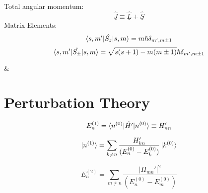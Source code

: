 \documentclass[table,cmyk]{article}
\begin{document}
\begin{longtable}
{\begin{minipage}{7.4cm}
\end{minipage}
}
\vspace{0.3cm}

Total angular momentum:
\[ \hat{\underline{J}} \equiv \hat{\underline{L}}+\hat{\underline{S}}\]
Matrix Elements:
\[\braket{s,m'|\hat{S_z}|s,m} = m\hbar \delta_{m',m\pm1}\]
\[\braket{s,m'|\hat{S_{\pm}}|s,m} = \sqrt{s(s+1)-m(m\pm1)} \hbar \delta_{m',m\pm1}\]

&
\section*{Perturbation Theory}
\[E_n^{(1)} = \braket{n^{(0)}|\hat{H'}|n^{(0)}} \equiv H_{nn}'\]

\[ \ket{n^{(1)}} = \sum_{k\ne n} \frac{H_{kn}'}{(E_n^{(0)}-E_k^{(0)})}\ket{k^{(0)}}\]

\[E_n^{(2)} = \sum_{m\ne n} \frac{|H_{mn}'|^2}{(E_n^{(0)}-E_m^{(0)})}\]




\tabularnewline\hline

\end{longtable}
\end{document}
